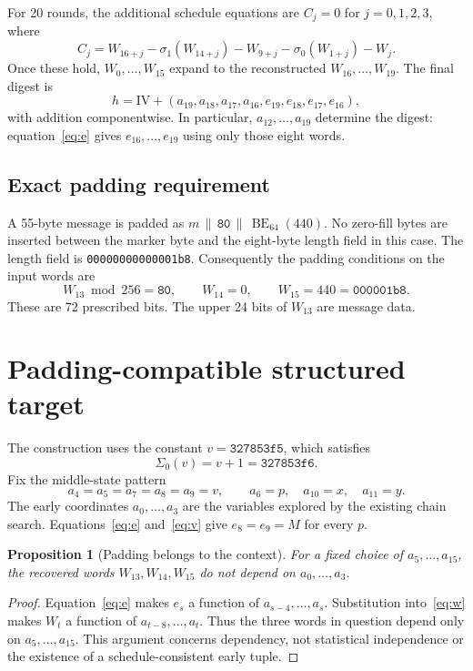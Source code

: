 \documentclass[11pt,a4paper]{article}
\newtheorem{proposition}{Proposition}
\newcommand{\IV}{\mathrm{IV}}
\newcommand{\hex}[1]{\texttt{#1}}
\begin{document}
For 20 rounds, the additional schedule equations are $C_j=0$ for $j=0,1,2,3$, where
\begin{equation}
C_j=W_{16+j}-\sigma_1(W_{14+j})-W_{9+j}
                   -\sigma_0(W_{1+j})-W_j.\label{eq:constraints}
\end{equation}
Once these hold, $W_0,\ldots,W_{15}$ expand to the reconstructed $W_{16},\ldots,W_{19}$. The final digest is
\begin{equation}
h=\IV+(a_{19},a_{18},a_{17},a_{16},e_{19},e_{18},e_{17},e_{16}),\label{eq:digest}
\end{equation}
with addition componentwise. In particular, $a_{12},\ldots,a_{19}$ determine the digest: equation~\eqref{eq:e} gives $e_{16},\ldots,e_{19}$ using only those eight words.

\subsection{Exact padding requirement}
A 55-byte message is padded as $m\,\|\,\hex{80}\,\|\,\operatorname{BE}_{64}(440)$. No zero-fill bytes are inserted between the marker byte and the eight-byte length field in this case. The length field is \hex{00000000000001b8}. Consequently the padding conditions on the input words are
\begin{equation}
W_{13}\bmod256=\hex{80},\qquad W_{14}=0,\qquad W_{15}=440=\hex{000001b8}.\label{eq:pad}
\end{equation}
These are 72 prescribed bits. The upper 24 bits of $W_{13}$ are message data.

\section{Padding-compatible structured target}
\label{sec:construction}
The construction uses the constant $v=\hex{327853f5}$, which satisfies
\begin{equation}
\Sigma_0(v)=v+1=\hex{327853f6}.\label{eq:v}
\end{equation}
Fix the middle-state pattern
\begin{equation}
a_4=a_5=a_7=a_8=a_9=v,\qquad a_6=p,\quad a_{10}=x,\quad a_{11}=y.\label{eq:frame}
\end{equation}
The early coordinates $a_0,\ldots,a_3$ are the variables explored by the existing chain search. Equations~\eqref{eq:e} and~\eqref{eq:v} give $e_8=e_9=M$ for every $p$.

\begin{proposition}[Padding belongs to the context]
For a fixed choice of $a_5,\ldots,a_{15}$, the recovered words $W_{13},W_{14},W_{15}$ do not depend on $a_0,\ldots,a_3$.
\end{proposition}
\begin{proof}
Equation~\eqref{eq:e} makes $e_s$ a function of $a_{s-4},\ldots,a_s$. Substitution into~\eqref{eq:w} makes $W_t$ a function of $a_{t-8},\ldots,a_t$. Thus the three words in question depend only on $a_5,\ldots,a_{15}$. This argument concerns dependency, not statistical independence or the existence of a schedule-consistent early tuple.
\end{proof}
\end{document}
